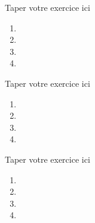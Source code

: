 \documentclass[12pt,a4paper]{report}
\begin{document}
\begin{exo}
 Taper votre exercice ici
 \begin{enumerate}
 \item 
 \item 
 \item 
 \item
 \end{enumerate}
\end{exo}
\begin{exo}
 Taper votre exercice ici
 \begin{enumerate}
 \item 
 \item 
 \item 
 \item
 \end{enumerate}
\end{exo}
\begin{exo}
 Taper votre exercice ici
 \begin{enumerate}
 \item 
 \item 
 \item 
 \item
 \end{enumerate}
\end{exo}
\end{document}
